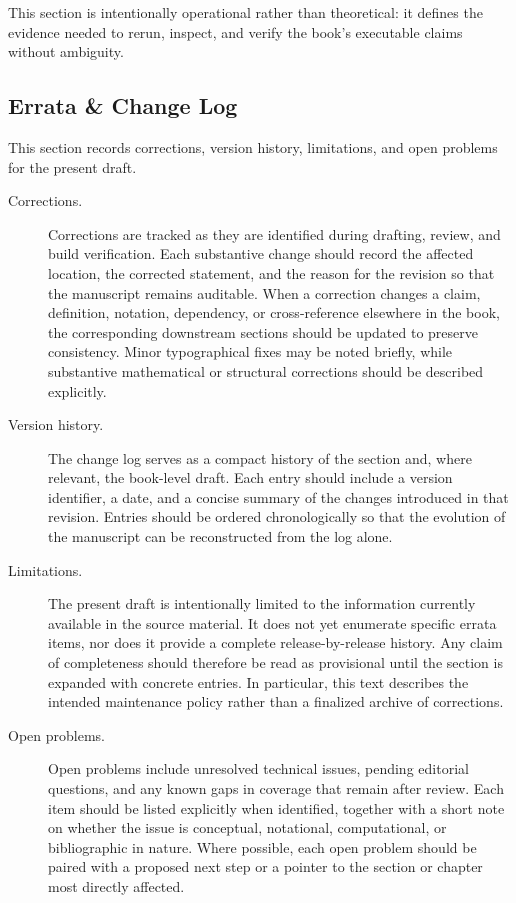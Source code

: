 \documentclass[11pt]{article}
\begin{document}
This section is intentionally operational rather than theoretical: it defines the evidence needed to rerun, inspect, and verify the book's executable claims without ambiguity.


\subsection{Errata \& Change Log}

This section records corrections, version history, limitations, and open problems for the present draft.

\begin{description}
  \item[Corrections.] Corrections are tracked as they are identified during drafting, review, and build verification. Each substantive change should record the affected location, the corrected statement, and the reason for the revision so that the manuscript remains auditable. When a correction changes a claim, definition, notation, dependency, or cross-reference elsewhere in the book, the corresponding downstream sections should be updated to preserve consistency. Minor typographical fixes may be noted briefly, while substantive mathematical or structural corrections should be described explicitly.

  \item[Version history.] The change log serves as a compact history of the section and, where relevant, the book-level draft. Each entry should include a version identifier, a date, and a concise summary of the changes introduced in that revision. Entries should be ordered chronologically so that the evolution of the manuscript can be reconstructed from the log alone.

  \item[Limitations.] The present draft is intentionally limited to the information currently available in the source material. It does not yet enumerate specific errata items, nor does it provide a complete release-by-release history. Any claim of completeness should therefore be read as provisional until the section is expanded with concrete entries. In particular, this text describes the intended maintenance policy rather than a finalized archive of corrections.

  \item[Open problems.] Open problems include unresolved technical issues, pending editorial questions, and any known gaps in coverage that remain after review. Each item should be listed explicitly when identified, together with a short note on whether the issue is conceptual, notational, computational, or bibliographic in nature. Where possible, each open problem should be paired with a proposed next step or a pointer to the section or chapter most directly affected.
\end{description}
\end{document}
